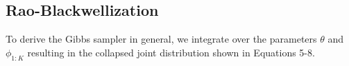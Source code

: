 \documentclass{article}
\begin{document}


\begin{small}  




\end{small} 

\newpage{}


\subsection{Rao-Blackwellization}

To derive the Gibbs sampler in general, we integrate over the parameters
$\theta$ and $\phi_{1:K}$ resulting in the collapsed joint distribution
shown in Equations 5-8.
\end{document}
